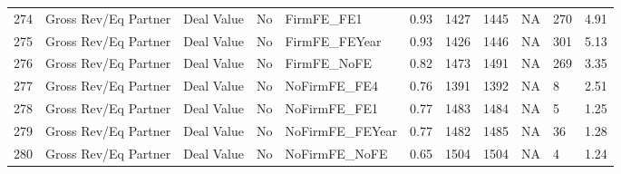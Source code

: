 \documentclass{article}
\begin{document}
\begin{table}[H]
\begin{tabular}{rllllllllll}
  274 & Gross Rev/Eq Partner & Deal Value & No & FirmFE\_FE1 & 0.93 & 1427 & 1445 & NA & 270 & 4.91 \\
  275 & Gross Rev/Eq Partner & Deal Value & No & FirmFE\_FEYear & 0.93 & 1426 & 1446 & NA & 301 & 5.13 \\
  276 & Gross Rev/Eq Partner & Deal Value & No & FirmFE\_NoFE & 0.82 & 1473 & 1491 & NA & 269 & 3.35 \\
  277 & Gross Rev/Eq Partner & Deal Value & No & NoFirmFE\_FE4 & 0.76 & 1391 & 1392 & NA & 8 & 2.51 \\
  278 & Gross Rev/Eq Partner & Deal Value & No & NoFirmFE\_FE1 & 0.77 & 1483 & 1484 & NA & 5 & 1.25 \\
  279 & Gross Rev/Eq Partner & Deal Value & No & NoFirmFE\_FEYear & 0.77 & 1482 & 1485 & NA & 36 & 1.28 \\
  280 & Gross Rev/Eq Partner & Deal Value & No & NoFirmFE\_NoFE & 0.65 & 1504 & 1504 & NA & 4 & 1.24 \\
   \hline
\end{tabular}
\end{table}
\end{document}
